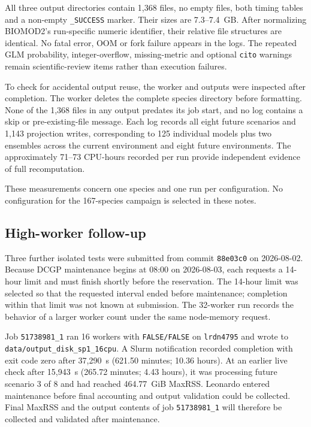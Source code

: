 All three output directories contain 1,368 files, no empty files, both timing tables and a non-empty \texttt{\_SUCCESS} marker. Their sizes are 7.3--7.4~GB. After normalizing BIOMOD2's run-specific numeric identifier, their relative file structures are identical. No fatal error, OOM or fork failure appears in the logs. The repeated GLM probability, integer-overflow, missing-metric and optional \texttt{cito} warnings remain scientific-review items rather than execution failures.

To check for accidental output reuse, the worker and outputs were inspected after completion. The worker deletes the complete species directory before formatting. None of the 1,368 files in any output predates its job start, and no log contains a skip or pre-existing-file message. Each log records all eight future scenarios and 1,143 projection writes, corresponding to 125 individual models plus two ensembles across the current environment and eight future environments. The approximately 71--73 CPU-hours recorded per run provide independent evidence of full recomputation.

These measurements concern one species and one run per configuration. No configuration for the 167-species campaign is selected in these notes.

\subsection{High-worker follow-up}

Three further isolated tests were submitted from commit \texttt{88e03c0} on 2026-08-02. Because DCGP maintenance begins at 08:00 on 2026-08-03, each requests a 14-hour limit and must finish shortly before the reservation. The 14-hour limit was selected so that the requested interval ended before maintenance; completion within that limit was not known at submission. The 32-worker run records the behavior of a larger worker count under the same node-memory request.

Job \texttt{51738981\_1} ran 16 workers with \texttt{FALSE/FALSE} on \texttt{lrdn4795} and wrote to \nolinkurl{data/output_disk_sp1_16cpu}. A Slurm notification recorded completion with exit code zero after 37,290~s (621.50 minutes; 10.36 hours). At an earlier live check after 15,943~s (265.72 minutes; 4.43 hours), it was processing future scenario 3 of 8 and had reached 464.77~GiB MaxRSS. Leonardo entered maintenance before final accounting and output validation could be collected. Final MaxRSS and the output contents of job \texttt{51738981\_1} will therefore be collected and validated after maintenance.

